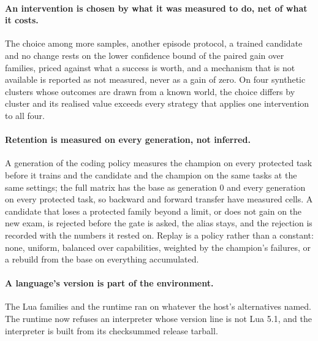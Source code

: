 \paragraph{An intervention is chosen by what it was measured to do, net of what it costs.} The
choice among more samples, another episode protocol, a trained candidate and no change rests on
the lower confidence bound of the paired gain over families, priced against what a success is
worth, and a mechanism that is not available is reported as not measured, never as a gain of
zero. On four synthetic clusters whose outcomes are drawn from a known world, the choice
differs by cluster and its realised value exceeds every strategy that applies one intervention to
all four.

\paragraph{Retention is measured on every generation, not inferred.} A generation of the coding
policy measures the champion on every protected task before it trains and the candidate and the
champion on the same tasks at the same settings; the full matrix has the base as generation 0 and
every generation on every protected task, so backward and forward transfer have measured
cells. A candidate that loses a protected family beyond a limit, or does not gain
on the new exam, is rejected before the gate is asked, the alias stays, and the rejection is
recorded with the numbers it rested on. Replay is a policy rather than a constant: none,
uniform, balanced over capabilities, weighted by the champion's failures, or a rebuild from the
base on everything accumulated.

\paragraph{A language's version is part of the environment.} The Lua families and the 
runtime ran on whatever  the host's alternatives named. The runtime now refuses an
interpreter whose version line is not Lua 5.1, and the interpreter is built from its checksummed
release tarball.
